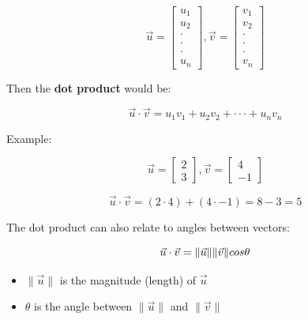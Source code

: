 \documentclass[12pt]{report}
\begin{document}
            \begin{equation}
                \vec{u} = \begin{bmatrix} u_1 \\ u_2 \\ \cdot \\ \cdot \\ \cdot \\ u_n \end{bmatrix},
                \vec{v} = \begin{bmatrix} v_1 \\ v_2 \\ \cdot \\ \cdot \\ \cdot \\ v_n \end{bmatrix} 
            \end{equation}

            Then the \textbf{dot product} would be:

            \begin{equation}
                \vec{u} \cdot \vec{v} = u_1v_1 + u_2v_2 +\cdot \cdot \cdot + u_nv_n
            \end{equation}

            \newpage
            Example:

            \begin{equation}
                \vec{u} = \begin{bmatrix} 2 \\ 3 \end{bmatrix},
                \vec{v} = \begin{bmatrix} 4 \\ -1 \end{bmatrix}
            \end{equation}

            \begin{equation}
                \vec{u} \cdot \vec{v} = (2 \cdot 4) + (4 \cdot -1) = 8 -3 = 5
            \end{equation}

            The dot product can also relate to angles between vectors:

            \begin{equation}
                \vec{u} \cdot \vec{v} = \|\vec{u}\| \|\vec{v}\|\\cos\theta
            \end{equation}

            \begin{itemize}
                \item $\|\vec{u}\|$ is the magnitude (length) of $\vec{u}$
                \item $\theta$ is the angle between $\|\vec{u}\|$ and $\|\vec{v}\|$
            \end{itemize}
\end{document}
